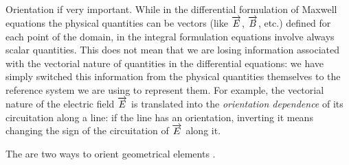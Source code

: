 Orientation if very important. While in the differential formulation
of Maxwell equations the physical quantities can be vectors (like
$\overrightarrow{E}$, $\overrightarrow{B}$, etc.) defined for each point of the domain, in the
integral formulation equations involve always scalar quantities. This
does not mean that we are losing information associated with the
vectorial nature of quantities in the differential equations: we have
simply switched this information from the physical quantities
themselves to the reference system we are using to represent them. For
example, the vectorial nature of the electric field $\overrightarrow{E}$ is translated
into the \emph{orientation dependence} of its circuitation along a
line: if the line has an orientation, inverting it means changing the
sign of the circuitation of $\overrightarrow{E}$ along it.

The are two ways to orient geometrical elements \cite{tonti_formulazione}.
